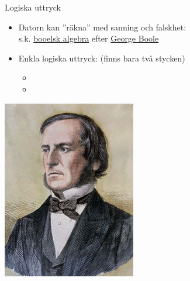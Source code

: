 \begin{Slide}{Logiska uttryck}\SlideFontSmall
\begin{minipage}{.8\textwidth}
\begin{itemize}
\item Datorn kan ''räkna'' med sanning och falskhet: \\
s.k. \href{https://en.wikipedia.org/wiki/Boolean_algebra}{booelsk algebra} efter \href{https://en.wikipedia.org/wiki/George_Boole}{George Boole}

\item Enkla logiska uttryck: (finns bara två stycken)
\begin{itemize}
\item[] 
\item[] 
\end{itemize}
\end{itemize}
\end{minipage}%
\begin{minipage}{.2\textwidth}
\centering\includegraphics[width=0.9\columnwidth]{../img/boole}
\end{minipage}%
\begin{itemize}



\end{itemize}
\end{Slide}
